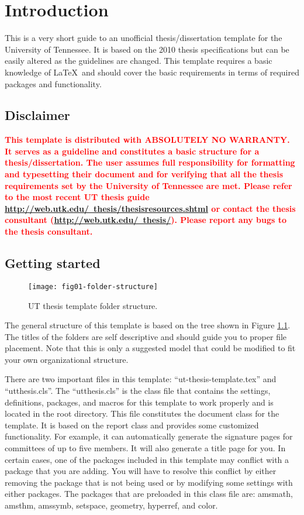\chapter{Introduction} \label{ch:introduction}

This is a very short guide to an unofficial thesis/dissertation template for the University of Tennessee. It is based on the 2010 thesis specifications but can be easily altered as the guidelines are changed. This template requires a basic knowledge of \LaTeX\ and should cover the basic requirements in terms of required packages and functionality.

\section{Disclaimer}
\textcolor{red}{\bf
This template is distributed with ABSOLUTELY NO WARRANTY. It serves as a guideline and constitutes a basic structure for a thesis/dissertation. The user assumes full responsibility for formatting and typesetting their document and for verifying that all the thesis requirements set by the University of Tennessee are met. Please refer to the most recent UT thesis guide \href{http://web.utk.edu/~thesis/thesisresources.shtml}{http://web.utk.edu/~thesis/thesisresources.shtml} or contact the thesis consultant (\href{http://web.utk.edu/~thesis/}{http://web.utk.edu/~thesis/}). Please report any bugs to the thesis consultant.}

\section{Getting started}
\begin{figure}[b!]
  \centering
  \texttt{[image: fig01-folder-structure]}\\
  \caption{UT thesis template folder structure.}\label{fig:intro-folder-structure}
\end{figure}
The general structure of this template is based on the tree shown in Figure \ref{fig:intro-folder-structure}. The titles of the folders are self descriptive and should guide you to proper file placement. Note that this is only a suggested model that could be modified to fit your own organizational structure.

There are two important files in this template: ``ut-thesis-template.tex'' and ``utthesis.cls''. The ``utthesis.cls'' is the class file that contains the settings, definitions, packages, and macros for this template to work properly and is located in the root directory. This file constitutes the document class for the template. It is based on the report class and provides some customized functionality. For example, it can automatically generate the signature pages for committees of up to five members. It will also generate a title page for you. In certain cases, one of the packages included in this template may conflict with a package that you are adding. You will have to resolve this conflict by either removing the package that is not being used or by modifying some settings with either packages. The packages that are preloaded in this class file are: amsmath, amsthm, amssymb, setspace, geometry, hyperref, and color.


